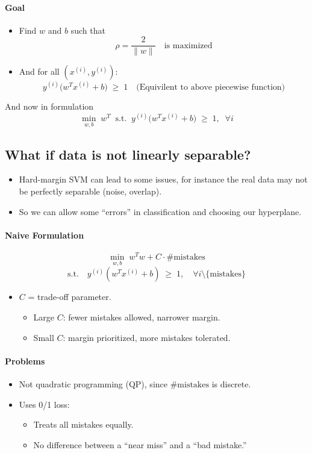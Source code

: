 \documentclass[11pt]{article}
\begin{document}
\paragraph{Goal}
\begin{itemize}
    \item Find $w$ and $b$ such that
    \[
    \rho = \frac{2}{\|w\|} \quad \text{is maximized}
    \]
    \item And for all $(x^{(i)}, y^{(i)})$:
    \[
    y^{(i)} \big(w^T x^{(i)} + b\big) \;\geq\; 1 \quad \text{(Equivilent to above piecewise function)}
    \]
\end{itemize}

And now in formulation
\[
 \min_{w,b} \; w^T \; \; \text{s.t.} \; \; y^{(i)} \big(w^T x^{(i)} + b\big) \;\geq\; 1, 
\; \; \forall i
\]

\subsection*{What if data is not linearly separable?}

\begin{itemize}
    \item Hard-margin SVM can lead to some issues, for instance the real data may not be perfectly separable (noise, overlap).
    \item So we can allow some ``errors'' in classification and choosing our hyperplane.
\end{itemize}

\paragraph*{Naive Formulation}
\[
\min_{w,b} \; w^T w + C \cdot \#\text{mistakes}
\]
\[
\text{s.t.} \quad y^{(i)}(w^T x^{(i)} + b) \;\geq\; 1, \quad \forall i \setminus \{\text{mistakes}\}
\]

\begin{itemize}
    \item $C$ = trade-off parameter.
        \begin{itemize}
            \item Large $C$: fewer mistakes allowed, narrower margin.
            \item Small $C$: margin prioritized, more mistakes tolerated.
        \end{itemize}
\end{itemize}

\paragraph*{Problems}
\begin{itemize}
    \item Not quadratic programming (QP), since $\#\text{mistakes}$ is discrete.
    \item Uses 0/1 loss:
    \begin{itemize}
        \item Treats all mistakes equally.
        \item No difference between a ``near miss'' and a ``bad mistake.''
    \end{itemize}
\end{itemize}
\end{document}
